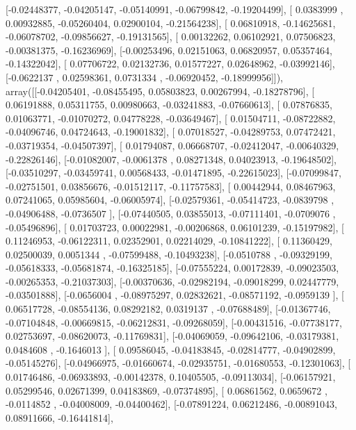 \documentclass{article}
\begin{document}
       [-0.02448377, -0.04205147, -0.05140991, -0.06799842, -0.19204499],
       [ 0.0383999 ,  0.00932885, -0.05260404,  0.02900104, -0.21564238],
       [ 0.06810918, -0.14625681, -0.06078702, -0.09856627, -0.19131565],
       [ 0.00132262,  0.06102921,  0.07506823, -0.00381375, -0.16236969],
       [-0.00253496,  0.02151063,  0.06820957,  0.05357464, -0.14322042],
       [ 0.07706722,  0.02132736,  0.01577227,  0.02648962, -0.03992146],
       [-0.0622137 ,  0.02598361,  0.0731334 , -0.06920452, -0.18999956]]), array([[-0.04205401, -0.08455495,  0.05803823,  0.00267994, -0.18278796],
       [ 0.06191888,  0.05311755,  0.00980663, -0.03241883, -0.07660613],
       [ 0.07876835,  0.01063771, -0.01070272,  0.04778228, -0.03649467],
       [ 0.01504711, -0.08722882, -0.04096746,  0.04724643, -0.19001832],
       [ 0.07018527, -0.04289753,  0.07472421, -0.03719354, -0.04507397],
       [ 0.01794087,  0.06668707, -0.02412047, -0.00640329, -0.22826146],
       [-0.01082007, -0.0061378 ,  0.08271348,  0.04023913, -0.19648502],
       [-0.03510297, -0.03459741,  0.00568433, -0.01471895, -0.22615023],
       [-0.07099847, -0.02751501,  0.03856676, -0.01512117, -0.11757583],
       [ 0.00442944,  0.08467963,  0.07241065,  0.05985604, -0.06005974],
       [-0.02579361, -0.05414723, -0.0839798 , -0.04906488, -0.0736507 ],
       [-0.07440505,  0.03855013, -0.07111401, -0.0709076 , -0.05496896],
       [ 0.01703723,  0.00022981, -0.00206868,  0.06101239, -0.15197982],
       [ 0.11246953, -0.06122311,  0.02352901,  0.02214029, -0.10841222],
       [ 0.11360429,  0.02500039,  0.0051344 , -0.07599488, -0.10493238],
       [-0.0510788 , -0.09329199, -0.05618333, -0.05681874, -0.16325185],
       [-0.07555224,  0.00172839, -0.09023503, -0.00265353, -0.21037303],
       [-0.00370636, -0.02982194, -0.09018299,  0.02447779, -0.03501888],
       [-0.0656004 , -0.08975297,  0.02832621, -0.08571192, -0.0959139 ],
       [ 0.06517728, -0.08554136,  0.08292182,  0.0319137 , -0.07688489],
       [-0.01367746, -0.07104848, -0.00669815, -0.06212831, -0.09268059],
       [-0.00431516, -0.07738177,  0.02753697, -0.08620073, -0.11769831],
       [-0.04069059, -0.09642106, -0.03179381,  0.0484608 , -0.1646013 ],
       [ 0.09586045, -0.04183845, -0.02814777, -0.04902899, -0.05145276],
       [-0.04966975, -0.01660674, -0.02935751, -0.01680553, -0.12301063],
       [ 0.01746486, -0.06933893, -0.00142378,  0.10405505, -0.09113034],
       [-0.06157921,  0.05299546,  0.02671399,  0.04183869, -0.07374895],
       [ 0.06861562,  0.0659672 , -0.0114852 , -0.04008009, -0.04400462],
       [-0.07891224,  0.06212486, -0.00891043,  0.08911666, -0.16441814],
\end{document}
